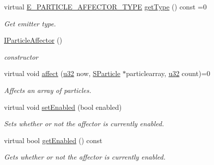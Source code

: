 \begin{DoxyCompactItemize}
virtual \hyperlink{namespaceirr_1_1scene_a34c0f9475cfcbda8b50ad816a046010b}{E\+\_\+\+P\+A\+R\+T\+I\+C\+L\+E\+\_\+\+A\+F\+F\+E\+C\+T\+O\+R\+\_\+\+T\+Y\+PE} \hyperlink{classirr_1_1scene_1_1IParticleAffector_add5652cd7dabb91342497fed776e2557}{get\+Type} () const =0
\begin{DoxyCompactList}\small\item\em Get emitter type. \end{DoxyCompactList}\item 
\mbox{\label{classirr_1_1scene_1_1IParticleAffector_a060c7080c8c619e9bb2d35c7ac981889}} 
\hyperlink{classirr_1_1scene_1_1IParticleAffector_a060c7080c8c619e9bb2d35c7ac981889}{I\+Particle\+Affector} ()
\begin{DoxyCompactList}\small\item\em constructor \end{DoxyCompactList}\item 
virtual void \hyperlink{classirr_1_1scene_1_1IParticleAffector_a87fb9116bb1a4d3ea075c59f3e2d1dbc}{affect} (\hyperlink{namespaceirr_a0416a53257075833e7002efd0a18e804}{u32} now, \hyperlink{structirr_1_1scene_1_1SParticle}{S\+Particle} $\ast$particlearray, \hyperlink{namespaceirr_a0416a53257075833e7002efd0a18e804}{u32} count)=0
\begin{DoxyCompactList}\small\item\em Affects an array of particles. \end{DoxyCompactList}\item 
\mbox{\label{classirr_1_1scene_1_1IParticleAffector_aa3715a5686640a180462ad7843aaff0b}} 
virtual void \hyperlink{classirr_1_1scene_1_1IParticleAffector_aa3715a5686640a180462ad7843aaff0b}{set\+Enabled} (bool enabled)
\begin{DoxyCompactList}\small\item\em Sets whether or not the affector is currently enabled. \end{DoxyCompactList}\item 
\mbox{\label{classirr_1_1scene_1_1IParticleAffector_a5665add84311a13c2dbfed3a77670cae}} 
virtual bool \hyperlink{classirr_1_1scene_1_1IParticleAffector_a5665add84311a13c2dbfed3a77670cae}{get\+Enabled} () const
\begin{DoxyCompactList}\small\item\em Gets whether or not the affector is currently enabled. \end{DoxyCompactList}\item 

\end{DoxyCompactItemize}
